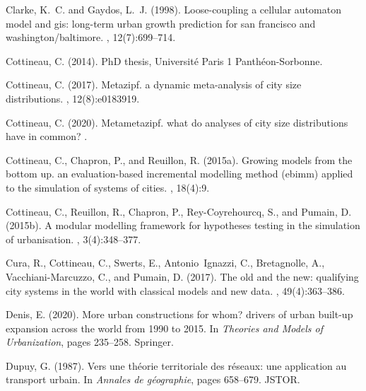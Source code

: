 \documentclass[10pt,letterpaper]{article}
\begin{document}
\begin{thebibliography}{}
Clarke, K.~C. and Gaydos, L.~J. (1998).
\newblock Loose-coupling a cellular automaton model and gis: long-term urban
  growth prediction for san francisco and washington/baltimore.
,
  12(7):699--714.

Cottineau, C. (2014).
\newblock PhD thesis, Universit{\'e} Paris 1 Panth{\'e}on-Sorbonne.

Cottineau, C. (2017).
\newblock Metazipf. a dynamic meta-analysis of city size distributions.
, 12(8):e0183919.

Cottineau, C. (2020).
\newblock Metametazipf. what do analyses of city size distributions have in
  common?
.

Cottineau, C., Chapron, P., and Reuillon, R. (2015a).
\newblock Growing models from the bottom up. an evaluation-based incremental
  modelling method (ebimm) applied to the simulation of systems of cities.
, 18(4):9.

Cottineau, C., Reuillon, R., Chapron, P., Rey-Coyrehourcq, S., and Pumain, D.
  (2015b).
\newblock A modular modelling framework for hypotheses testing in the
  simulation of urbanisation.
, 3(4):348--377.

Cura, R., Cottineau, C., Swerts, E., Antonio~Ignazzi, C., Bretagnolle, A.,
  Vacchiani-Marcuzzo, C., and Pumain, D. (2017).
\newblock The old and the new: qualifying city systems in the world with
  classical models and new data.
, 49(4):363--386.

Denis, E. (2020).
\newblock More urban constructions for whom? drivers of urban built-up
  expansion across the world from 1990 to 2015.
\newblock In {\em Theories and Models of Urbanization}, pages 235--258.
  Springer.

Dupuy, G. (1987).
\newblock Vers une th{\'e}orie territoriale des r{\'e}seaux: une application au
  transport urbain.
\newblock In {\em Annales de g{\'e}ographie}, pages 658--679. JSTOR.


\end{thebibliography}
\end{document}
